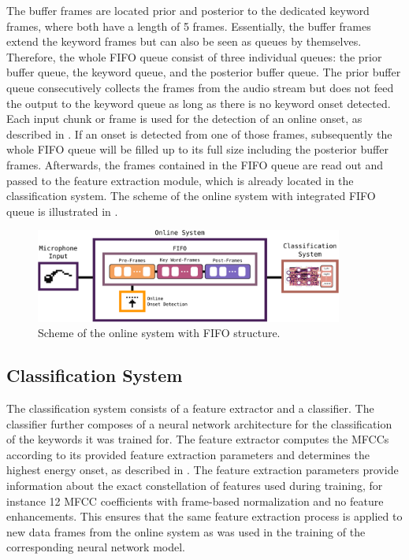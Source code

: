The buffer frames are located prior and posterior to the dedicated keyword frames, where both have a length of 5 frames.
Essentially, the buffer frames extend the keyword frames but can also be seen as queues by themselves.
Therefore, the whole FIFO queue consist of three individual queues: the prior buffer queue, the keyword queue, and the posterior buffer queue.
The prior buffer queue consecutively collects the frames from the audio stream but does not feed the output to the keyword queue as long as there is no keyword onset detected.
Each input chunk or frame is used for the detection of an online onset, as described in .
If an onset is detected from one of those frames, subsequently the whole FIFO queue will be filled up to its full size including the posterior buffer frames.
Afterwards, the frames contained in the FIFO queue are read out and passed to the feature extraction module, which is already located in the classification system.
The scheme of the online system with integrated FIFO queue is illustrated in .
\begin{figure}[!ht]
  \centering
  \includegraphics[width=0.9\textwidth]{./6_game/figs/game_system_online.pdf}
  \caption{Scheme of the online system with FIFO structure.}
  \label{fig:game_system_online}
\end{figure}
\FloatBarrier
\noindent



\subsection{Classification System}
The classification system consists of a feature extractor and a classifier.
The classifier further composes of a neural network architecture for the classification of the keywords it was trained for.
The feature extractor computes the MFCCs according to its provided feature extraction parameters and determines the highest energy onset, as described in .
The feature extraction parameters provide information about the exact constellation of features used during training, for instance 12 MFCC coefficients with frame-based normalization and no feature enhancements.
This ensures that the same feature extraction process is applied to new data frames from the online system as was used in the training of the corresponding neural network model.

